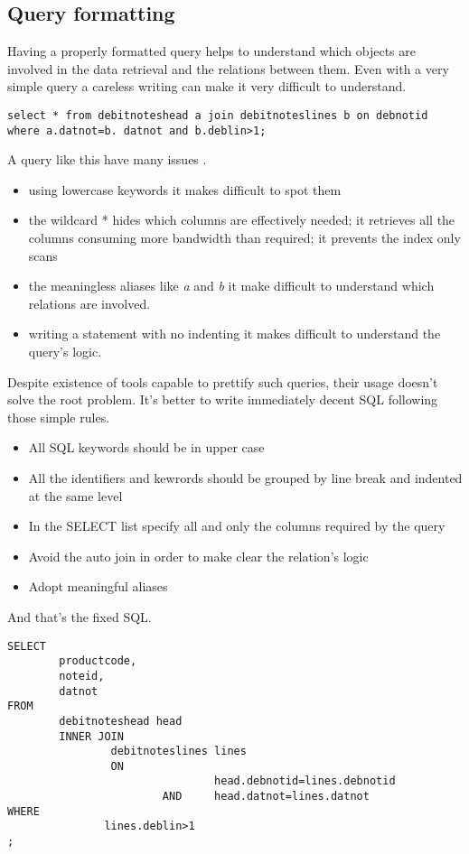 \subsection{Query formatting}
Having a properly formatted query helps to understand which objects are involved in the data
retrieval and the relations between them. Even with a very simple query a careless writing can make
it very difficult to understand.


\begin{lstlisting}[style=pgsql]
select * from debitnoteshead a join debitnoteslines b on debnotid 
where a.datnot=b. datnot and b.deblin>1;
\end{lstlisting}

A query like this have many issues .\newline

\begin{itemize}
 \item using lowercase keywords it makes difficult to spot them
\item the wildcard * hides which columns are effectively needed; it retrieves all the columns
consuming more bandwidth than required; it prevents the index only scans
\item the meaningless aliases like \textit{a} and \textit{b} it make difficult to understand which
relations are involved.
\item writing a statement with no indenting it makes difficult to understand the query's
logic.
\end{itemize}

Despite existence of tools capable to prettify such queries, their usage doesn't solve the
root problem. It's better to write immediately decent SQL following those simple rules.

\begin{itemize}
 \item All SQL keywords should be in upper case
 \item All the identifiers and kewrords should be grouped by line break and indented at the same
level
 \item In the SELECT list specify all and only the columns required by the query
 \item Avoid the auto join in order to make clear the relation's logic
 \item Adopt meaningful aliases
\end{itemize}

And that's the fixed SQL.

\begin{lstlisting}[style=pgsql]
SELECT
        productcode,
        noteid,
        datnot
FROM
        debitnoteshead head
        INNER JOIN
                debitnoteslines lines
                ON
                                head.debnotid=lines.debnotid
                        AND     head.datnot=lines.datnot
WHERE
               lines.deblin>1
;
\end{lstlisting}


